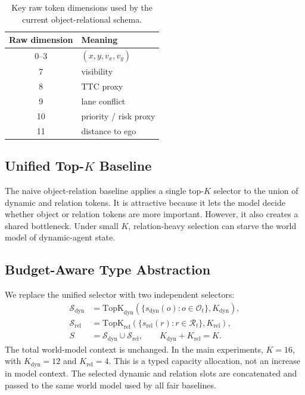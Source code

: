 \documentclass[10pt]{article}
\newcommand{\kctx}{K}
\newcommand{\kdyn}{K_{\mathrm{dyn}}}
\newcommand{\krel}{K_{\mathrm{rel}}}
\newcommand{\sdyn}{\mathcal{S}_{\mathrm{dyn}}}
\newcommand{\srel}{\mathcal{S}_{\mathrm{rel}}}
\begin{document}
\begin{table}[t]
\centering
\caption{Key raw token dimensions used by the current object-relational schema.}
\label{tab:token_schema}
\begin{tabular}{cl}
\toprule
Raw dimension & Meaning \\
\midrule
0--3 & $(x,y,v_x,v_y)$ \\
7 & visibility \\
8 & TTC proxy \\
9 & lane conflict \\
10 & priority / risk proxy \\
11 & distance to ego \\
\bottomrule
\end{tabular}
\end{table}

\subsection{Unified Top-$K$ Baseline}
The naive object-relation baseline applies a single top-$K$ selector to the union of dynamic and relation tokens. It is attractive because it lets the model decide whether object or relation tokens are more important. However, it also creates a shared bottleneck. Under small $K$, relation-heavy selection can starve the world model of dynamic-agent state.

\subsection{Budget-Aware Type Abstraction}
We replace the unified selector with two independent selectors:
\begin{align}
    \sdyn &= \mathrm{TopK}_{\mathrm{dyn}}\left(\{s_{\mathrm{dyn}}(o): o \in \mathcal{O}_t\}, \kdyn\right), \\
    \srel &= \mathrm{TopK}_{\mathrm{rel}}\left(\{s_{\mathrm{rel}}(r): r \in \mathcal{R}_t\}, \krel\right), \\
    S &= \sdyn \cup \srel, \qquad \kdyn + \krel = \kctx.
\end{align}
The total world-model context is unchanged. In the main experiments, $\kctx=16$, with $\kdyn=12$ and $\krel=4$. This is a typed capacity allocation, not an increase in model context. The selected dynamic and relation slots are concatenated and passed to the same world model used by all fair baselines.
\end{document}
